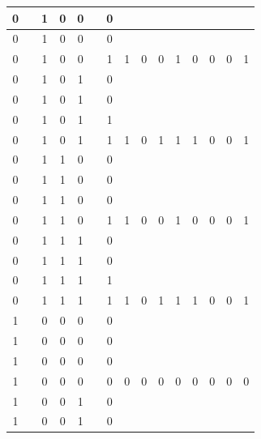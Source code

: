\begin{table}[!tb]
\begin{tabular}{|c|c|c|c|c|c|c|c|c|c|c|c|c|c|c|}
        \rowcolor{yellow!40} 0 &  & 1 & 0 & 0 &  & 0 &  &  &  &  &  &  &  &  \\ \hline
        \rowcolor{yellow!40} 0 &  & 1 & 0 & 0 &  & 0 &  &  &  &  &  &  &  &  \\ \hline
        \rowcolor{yellow!40} 0 &  & 1 & 0 & 0 &  & 1 & 1 & 0 & 0 & 1 & 0 & 0 & 0 & 1 \\ \hline
        \rowcolor{gray!40} 0 &  & 1 & 0 & 1 &  & 0 &  &  &  &  &  &  &  &  \\ \hline
        \rowcolor{gray!40} 0 &  & 1 & 0 & 1 &  & 0 &  &  &  &  &  &  &  &  \\ \hline
        \rowcolor{gray!40} 0 &  & 1 & 0 & 1 &  & 1 &  &  &  &  &  &  &  &  \\ \hline
        \rowcolor{gray!40} 0 &  & 1 & 0 & 1 &  & 1 & 1 & 0 & 1 & 1 & 1 & 0 & 0 & 1 \\ \hline
        \rowcolor{blue!40} 0 &  & 1 & 1 & 0 &  & 0 &  &  &  &  &  &  &  &  \\ \hline
        \rowcolor{blue!40} 0 &  & 1 & 1 & 0 &  & 0 &  &  &  &  &  &  &  &  \\ \hline
        \rowcolor{blue!40} 0 &  & 1 & 1 & 0 &  & 0 &  &  &  &  &  &  &  &  \\ \hline
        \rowcolor{blue!40} 0 &  & 1 & 1 & 0 &  & 1 & 1 & 0 & 0 & 1 & 0 & 0 & 0 & 1 \\ \hline
        \rowcolor{red!40} 0 &  & 1 & 1 & 1 &  & 0 &  &  &  &  &  &  &  &  \\ \hline
        \rowcolor{red!40} 0 &  & 1 & 1 & 1 &  & 0 &  &  &  &  &  &  &  &  \\ \hline
        \rowcolor{red!40} 0 &  & 1 & 1 & 1 &  & 1 &  &  &  &  &  &  &  &  \\ \hline
        \rowcolor{red!40} 0 &  & 1 & 1 & 1 &  & 1 & 1 & 0 & 1 & 1 & 1 & 0 & 0 & 1 \\ \hline
        \rowcolor{green!40} 1 &  & 0 & 0 & 0 &  & 0 &  &  &  &  &  &  &  &  \\ \hline
        \rowcolor{green!40} 1 &  & 0 & 0 & 0 &  & 0 &  &  &  &  &  &  &  &  \\ \hline
        \rowcolor{green!40} 1 &  & 0 & 0 & 0 &  & 0 &  &  &  &  &  &  &  &  \\ \hline
        \rowcolor{green!40} 1 &  & 0 & 0 & 0 &  & 0 & 0 & 0 & 0 & 0 & 0 & 0 & 0 & 0 \\ \hline
        \rowcolor{yellow!40} 1 &  & 0 & 0 & 1 &  & 0 &  &  &  &  &  &  &  &  \\ \hline
        \rowcolor{yellow!40} 1 &  & 0 & 0 & 1 &  & 0 &  &  &  &  &  &  &  &  \\ \hline

\end{tabular}
\end{table}

